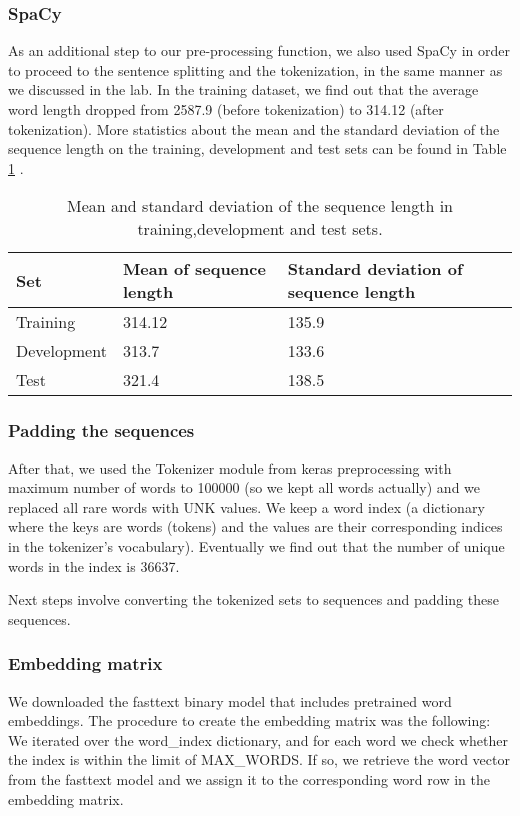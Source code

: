 \documentclass[10pt, a4paper]{article}
\begin{document}
	
	\subsubsection{SpaCy}
	As an additional step to our pre-processing function, we also used SpaCy in order to proceed to the sentence splitting and the tokenization, in the same manner as we discussed in the lab. In the training dataset, we find out that the average word length dropped from 2587.9 (before tokenization) to 314.12 (after tokenization). More statistics about the mean and the standard deviation of the sequence length on the training, development and test sets can be found in Table \ref{tab::ex-1-stats} .
	
	\begin{table}
		\begin{tabular}{|l|l|l|}
			\hline
			\cellcolor{blue!25}\textbf{Set} & \cellcolor{blue!25}\textbf{Mean of sequence length} &
			\cellcolor{blue!25}\textbf{Standard deviation of sequence length}\\
			\hline
			Training & 314.12 & 135.9 \\\hline
			Development & 313.7  & 133.6 \\\hline
			Test & 321.4 & 138.5 \\\hline
		\end{tabular}
		\centering
		\caption{Mean and standard deviation of the sequence length in training,development and test sets.}
		\label{tab::ex-1-stats}
	\end{table}
	
	
	
	\subsubsection{Padding the sequences}
	After that, we used the Tokenizer module from keras preprocessing with maximum number of words to 100000 (so we kept all words actually) and we replaced all rare words with UNK values. We keep a word index (a dictionary where the keys are words (tokens) and the values are their corresponding indices in the tokenizer's vocabulary). Eventually we find out that the number of unique words in the index is 36637.
	
	Next steps involve converting the tokenized sets to sequences and padding these sequences.
	
	\subsubsection{Embedding matrix}
	We downloaded the fasttext binary model that includes pretrained word embeddings. The procedure to create the embedding matrix was the following: We iterated over the word\_index dictionary, and for each word we check whether the index is within the limit of MAX\_WORDS. If so, we retrieve the word vector from the fasttext model and we assign it to the corresponding word row in the embedding matrix.
	
\end{document}

